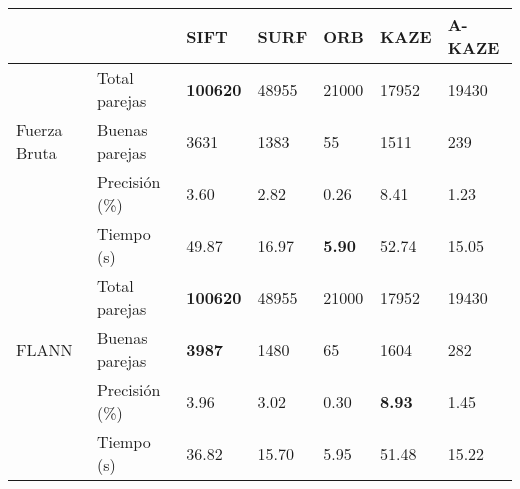 \begin{table}[h]
		\centering
		\label{SR}
		\renewcommand{\arraystretch}{0.8}%
		\begin{tabular}{@{}lllllll@{}}
			\toprule
			&              	 			& SIFT 			& SURF & ORB & KAZE & A-KAZE \\ \midrule 
			\hfill\vline& Total parejas  &\textbf{100620}&48955 &21000&17952 & 19430  \\
			Fuerza Bruta \vline& Buenas parejas & 3631 			& 1383 & 55  & 1511 & 239    \\
			\hfill\vline& Precisión (\%) & 3.60			&2.82  &0.26 & 8.41& 1.23  \\
			\vspace{0.3cm}
			\hfill\vline& Tiempo (s)     & 49.87& 16.97&\textbf{5.90} &52.74 & 15.05 \\
			
			\hfill\vline& Total parejas  &\textbf{100620}&48955 &21000			&17952 			& 19430  \\
			FLANN  \hfill\vline& Buenas parejas &\textbf{3987}  & 1480 & 65  			& 1604 			&282     \\ 
			\hfill\vline& Precisión (\%) & 3.96			&3.02  &0.30			& \textbf{8.93}& 1.45  \\
			\hfill\vline& Tiempo (s)     & 36.82			& 15.70& 5.95	& 51.48			& 15.22  \\ 
			\bottomrule
		\end{tabular}
\end{table}


